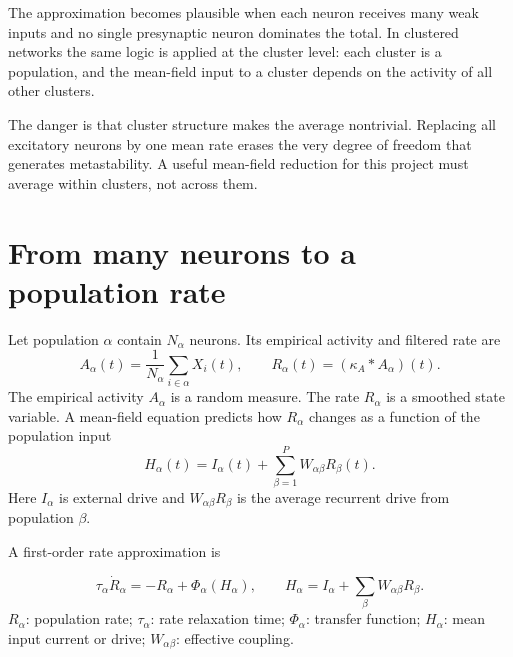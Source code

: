 The approximation becomes plausible when each neuron receives many weak inputs and no single presynaptic neuron dominates the total. In clustered networks the same logic is applied at the cluster level: each cluster is a population, and the mean-field input to a cluster depends on the activity of all other clusters.

The danger is that cluster structure makes the average nontrivial. Replacing all excitatory neurons by one mean rate erases the very degree of freedom that generates metastability. A useful mean-field reduction for this project must average within clusters, not across them.

\section{From many neurons to a population rate}
\label{sec:from-many-neurons-to-population-rate}

Let population $\alpha$ contain $N_\alpha$ neurons. Its empirical activity and filtered rate are
%
\begin{equation}
  A_\alpha(t)=\frac{1}{N_\alpha}\sum_{i\in\alpha}X_i(t),
  \qquad
  R_\alpha(t)=(\kappa_A*A_\alpha)(t).
  \label{eq:mf-activity-rate}
\end{equation}
%
The empirical activity $A_\alpha$ is a random measure. The rate $R_\alpha$ is a smoothed state variable. A mean-field equation predicts how $R_\alpha$ changes as a function of the population input
%
\begin{equation}
  H_\alpha(t)
  =
  I_\alpha(t)
  +
  \sum_{\beta=1}^P W_{\alpha\beta} R_\beta(t).
  \label{eq:mf-population-input}
\end{equation}
%
Here $I_\alpha$ is external drive and $W_{\alpha\beta}R_\beta$ is the average recurrent drive from population $\beta$.

A first-order rate approximation is
%
\begin{keyequation}
\begin{equation}
  \tau_\alpha \dot R_\alpha
  =
  -R_\alpha
  +
  \Phi_\alpha(H_\alpha),
  \qquad
  H_\alpha=I_\alpha+\sum_\beta W_{\alpha\beta}R_\beta .
  \label{eq:mean-field-rate-dynamics}
\end{equation}
\tcblower
$R_\alpha$: population rate; \quad
$\tau_\alpha$: rate relaxation time; \quad
$\Phi_\alpha$: transfer function; \quad
$H_\alpha$: mean input current or drive; \quad
$W_{\alpha\beta}$: effective coupling.
\end{keyequation}

